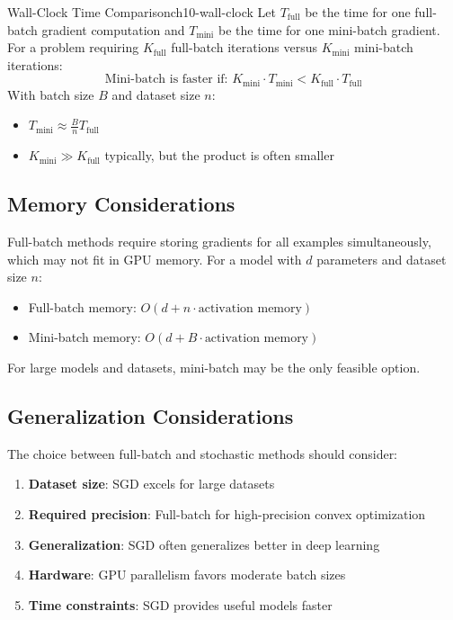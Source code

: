 \documentclass[../../main.tex]{subfiles}
\begin{document}
\begin{theorem}{Wall-Clock Time Comparison}{ch10-wall-clock}
Let $T_{\text{full}}$ be the time for one full-batch gradient computation and $T_{\text{mini}}$ be the time for one mini-batch gradient. For a problem requiring $K_{\text{full}}$ full-batch iterations versus $K_{\text{mini}}$ mini-batch iterations:
\[
    \text{Mini-batch is faster if: } K_{\text{mini}} \cdot T_{\text{mini}} < K_{\text{full}} \cdot T_{\text{full}}
\]
With batch size $B$ and dataset size $n$:
\begin{itemize}
    \item $T_{\text{mini}} \approx \frac{B}{n} T_{\text{full}}$
    \item $K_{\text{mini}} \gg K_{\text{full}}$ typically, but the product is often smaller
\end{itemize}
\end{theorem}

\subsection{Memory Considerations}

\begin{important}
Full-batch methods require storing gradients for all examples simultaneously, which may not fit in GPU memory. For a model with $d$ parameters and dataset size $n$:
\begin{itemize}
    \item Full-batch memory: $O(d + n \cdot \text{activation memory})$
    \item Mini-batch memory: $O(d + B \cdot \text{activation memory})$
\end{itemize}
For large models and datasets, mini-batch may be the only feasible option.
\end{important}

\subsection{Generalization Considerations}

\begin{principle}
The choice between full-batch and stochastic methods should consider:
\begin{enumerate}
    \item \textbf{Dataset size}: SGD excels for large datasets
    \item \textbf{Required precision}: Full-batch for high-precision convex optimization
    \item \textbf{Generalization}: SGD often generalizes better in deep learning
    \item \textbf{Hardware}: GPU parallelism favors moderate batch sizes
    \item \textbf{Time constraints}: SGD provides useful models faster
\end{enumerate}
\end{principle}
\end{document}
